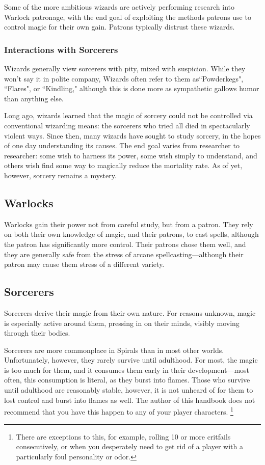 \begin{multicols}{2}
Some of the more ambitious wizards are actively performing research into Warlock patronage, with the end goal of exploiting the methods patrons use to control magic for their own gain.
Patrons typically distrust these wizards.

\subsubsection{Interactions with Sorcerers}
Wizards generally view sorcerers with pity, mixed with suspicion.
While they won't say it in polite company, Wizards often refer to them as``Powderkegs", ``Flares", or ``Kindling," although this is done more as sympathetic gallows humor than anything else.

Long ago, wizards learned that the magic of sorcery could not be controlled via conventional wizarding means: the sorcerers who tried all died in spectacularly violent ways.
Since then, many wizards have sought to study sorcery, in the hopes of one day understanding its causes.
The end goal varies from researcher to researcher: some wish to harness its power, some wish simply to understand, and others wish find some way to magically reduce the mortality rate.
As of yet, however, sorcery remains a mystery.

\subsection{Warlocks}

Warlocks gain their power not from careful study, but from a patron.
They rely on both their own knowledge of magic, and their patrons, to cast spells, although the patron has significantly more control.
Their patrons chose them well, and they are generally safe from the stress of arcane spellcasting---although their patron may cause them stress of a different variety.

\subsection{Sorcerers}
Sorcerers derive their magic from their own nature.
For reasons unknown, magic is especially active around them, pressing in on their minds, visibly moving through their bodies.

Sorcerers are more commonplace in Spirals than in most other worlds.
Unfortunately, however, they rarely survive until adulthood.
For most, the magic is too much for them, and it consumes them early in their development---most often, this consumption is literal, as they burst into flames.
Those who survive until adulthood are reasonably stable, however, it is not unheard of for them to lost control and burst into flames as well.
The author of this handbook does not recommend that you have this happen to any of your player characters.
\footnote{There are exceptions to this, for example, rolling 10 or more critfails consecutively, or when you desperately need to get rid of a player with a particularly foul personality or odor.}


\end{multicols}
